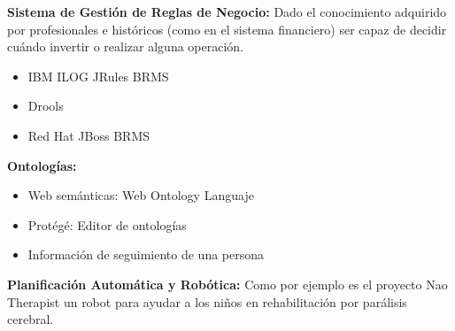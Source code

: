 \documentclass[12pt, twoside, openright]{report} %
\begin{document}
\textbf{Sistema de Gestión de Reglas de Negocio:} Dado el conocimiento adquirido por profesionales e históricos (como en el sistema financiero) ser capaz de decidir cuándo invertir o realizar alguna operación.
\begin{itemize}
	\item IBM ILOG JRules BRMS
	\item Drools
	\item Red Hat JBoss BRMS
\end{itemize}

\textbf{Ontologías:}
\begin{itemize}
	\item Web semánticas: Web Ontology Languaje
	\item Protégé: Editor de ontologías
	\item Información de seguimiento de una persona
\end{itemize}

\textbf{Planificación Automática y Robótica:} Como por ejemplo es el proyecto Nao Therapist un robot para ayudar a los niños en rehabilitación por parálisis cerebral.
\end{document}
